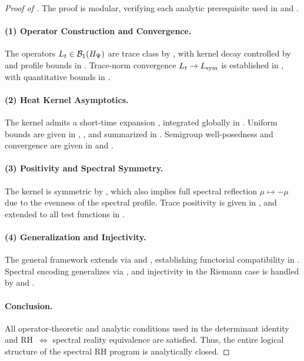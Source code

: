 \begin{proof}[Proof of ]
The proof is modular, verifying each analytic prerequisite used in  and .

\paragraph{(1) Operator Construction and Convergence.}
The operators \( L_t \in \mathcal{B}_1(H_{\Psi}) \) are trace class by , with kernel decay controlled by  and profile bounds in . Trace-norm convergence \( L_t \to L_{\mathrm{sym}} \) is established in , with quantitative bounds in .

\paragraph{(2) Heat Kernel Asymptotics.}
The kernel admits a short-time expansion , integrated globally in . Uniform bounds are given in , , and summarized in . Semigroup well-posedness and convergence are given in  and .

\paragraph{(3) Positivity and Spectral Symmetry.}
The kernel is symmetric by , which also implies full spectral reflection \( \mu \mapsto -\mu \) due to the evenness of the spectral profile. Trace positivity is given in , and extended to all test functions in .

\paragraph{(4) Generalization and Injectivity.}
The general framework extends via  and , establishing functorial compatibility in . Spectral encoding generalizes via , and injectivity in the Riemann case is handled by  and .

\paragraph{Conclusion.}
All operator-theoretic and analytic conditions used in the determinant identity and RH~\(\iff\) spectral reality equivalence are satisfied. Thus, the entire logical structure of the spectral RH program is analytically closed.
\end{proof}
